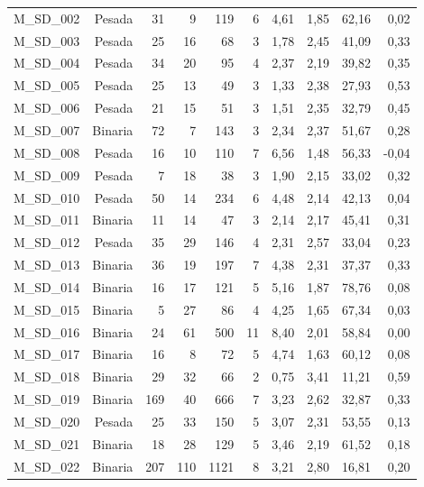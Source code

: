 \begin{table}[ht!]
\begin{tabular}{lrrrrrrrrr}
    M\_SD\_002 & Pesada & 31   & 9    & 119  & 6    & 4,61 & 1,85 & 62,16 & 0,02 \\
    M\_SD\_003 & Pesada & 25   & 16   & 68   & 3    & 1,78 & 2,45 & 41,09 & 0,33 \\
    M\_SD\_004 & Pesada & 34   & 20   & 95   & 4    & 2,37 & 2,19 & 39,82 & 0,35 \\
    M\_SD\_005 & Pesada & 25   & 13   & 49   & 3    & 1,33 & 2,38 & 27,93 & 0,53 \\
    M\_SD\_006 & Pesada & 21   & 15   & 51   & 3    & 1,51 & 2,35 & 32,79 & 0,45 \\
    M\_SD\_007 & Binaria & 72   & 7    & 143  & 3    & 2,34 & 2,37 & 51,67 & 0,28 \\
    M\_SD\_008 & Pesada & 16   & 10   & 110  & 7    & 6,56 & 1,48 & 56,33 & -0,04 \\
    M\_SD\_009 & Pesada & 7    & 18   & 38   & 3    & 1,90 & 2,15 & 33,02 & 0,32 \\
    M\_SD\_010 & Pesada & 50   & 14   & 234  & 6    & 4,48 & 2,14 & 42,13 & 0,04 \\
    M\_SD\_011 & Binaria & 11   & 14   & 47   & 3    & 2,14 & 2,17 & 45,41 & 0,31 \\
    M\_SD\_012 & Pesada & 35   & 29   & 146  & 4    & 2,31 & 2,57 & 33,04 & 0,23 \\
    M\_SD\_013 & Binaria & 36   & 19   & 197  & 7    & 4,38 & 2,31 & 37,37 & 0,33 \\
    M\_SD\_014 & Binaria & 16   & 17   & 121  & 5    & 5,16 & 1,87 & 78,76 & 0,08 \\
    M\_SD\_015 & Binaria & 5    & 27   & 86   & 4    & 4,25 & 1,65 & 67,34 & 0,03 \\
    M\_SD\_016 & Binaria & 24   & 61   & 500  & 11   & 8,40 & 2,01 & 58,84 & 0,00 \\
    M\_SD\_017 & Binaria & 16   & 8    & 72   & 5    & 4,74 & 1,63 & 60,12 & 0,08 \\
    M\_SD\_018 & Binaria & 29   & 32   & 66   & 2    & 0,75 & 3,41 & 11,21 & 0,59 \\
    M\_SD\_019 & Binaria & 169  & 40   & 666  & 7    & 3,23 & 2,62 & 32,87 & 0,33 \\
    M\_SD\_020 & Pesada & 25   & 33   & 150  & 5    & 3,07 & 2,31 & 53,55 & 0,13 \\
    M\_SD\_021 & Binaria & 18   & 28   & 129  & 5    & 3,46 & 2,19 & 61,52 & 0,18 \\
    M\_SD\_022 & Binaria & 207  & 110  & 1121 & 8    & 3,21 & 2,80 & 16,81 & 0,20 \\

\end{tabular}
\end{table}
